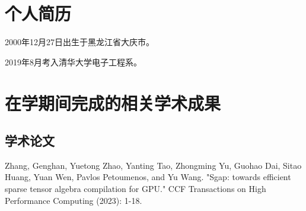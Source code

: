 
\begin{resume}

  \section*{个人简历}

  2000年12月27日出生于黑龙江省大庆市。

  2019年8月考入清华大学电子工程系。


  \section*{在学期间完成的相关学术成果}

  \subsection*{学术论文}

  \begin{achievements}
    \item Zhang, Genghan, Yuetong Zhao, Yanting Tao, Zhongming Yu, Guohao Dai, Sitao Huang, Yuan Wen, Pavlos Petoumenos, and Yu Wang. "Sgap: towards efficient sparse tensor algebra compilation for GPU." CCF Transactions on High Performance Computing (2023): 1-18.
  \end{achievements}


\end{resume}
